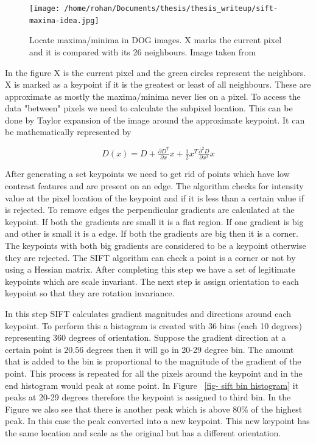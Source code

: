 \documentclass[12pt]{dalcsthesis}
\begin{document}
\begin{figure}
  \centering
     {\texttt{[image: /home/rohan/Documents/thesis/thesis\_writeup/sift-maxima-idea.jpg]}}
  \caption{\label{fig- maxima and minima sift octaves} Locate maxima/minima in DOG images. X marks the current pixel and it is compared with its 26 neighbours. Image taken from \cite{sift_url}}
\end{figure}

In the figure X is the current pixel and the green circles represent the neighbors. X is marked as a keypoint if it is the greatest or least of all neighbours. These are approximate as mostly the maxima/minima never lies on a pixel. To access the data "between" pixels we need to calculate the subpixel location. This can be done by Taylor expansion of the image around the approximate keypoint. It can be mathematically represented by 

\begin{equation}
D(x) = D + \tfrac{\partial D^{T}}{\partial x}x+\tfrac{1}{2}x^{T}\tfrac{\partial^{2} D}{\partial x^{2}}x
\end{equation}

After generating a set keypoints we need to get rid of points which have low contrast features and are present on an edge. The algorithm checks for intensity value at the pixel location of the keypoint and if it is less than a certain value if is rejected. To remove edges the perpendicular gradients are calculated at the keypoint. If both the gradients are small it is a flat region. If one gradient is big and other is small it is a edge. If both the gradients are big then it is a corner. The keypoints with both big gradients are considered to be a keypoint otherwise they are rejected. The SIFT algorithm can check a point is a corner or not by using a Hessian matrix. After completing this step we have a set of legitimate keypoints which are scale invariant. The next step is assign orientation to each keypoint so that they are rotation invariance. 

In this step SIFT calculates gradient magnitudes and directions around each keypoint. To perform this a histogram is created with 36 bins (each 10 degrees) representing 360 degrees of orientation. Suppose the gradient direction at a certain point is 20.56 degrees then it will go in 20-29 degree bin. The amount that is added to the bin is proportional to the magnitude of the gradient of the point. This process is repeated for all the pixels around the keypoint and in the end histogram would peak at some point. In Figure ~\ref{fig- sift bin histogram} it peaks at 20-29 degrees therefore the keypoint is assigned to third bin. In the Figure we also see that there is another peak which is above 80\% of the highest peak. In this case the peak converted into a new keypoint. This new keypoint has the same location and scale as the original but has a different orientation. 
\end{document}
